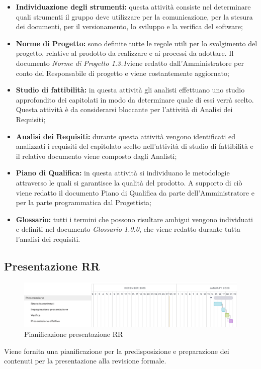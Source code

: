 \begin{itemize}
	\item \textbf{Individuazione degli strumenti:} questa attività consiste nel determinare quali strumenti il gruppo deve utilizzare per la comunicazione, per la stesura dei documenti, per il versionamento, lo sviluppo e la verifica del software;
	\item \textbf{Norme di Progetto:} sono definite tutte le regole utili per lo svolgimento del progetto, relative al prodotto da realizzare e ai processi da adottare. Il documento \textit{Norme di Progetto 1.3.1}\doc viene redatto dall'Amministratore per conto del Responsabile di progetto e viene costantemente aggiornato;
	\item \textbf{Studio di fattibilità:} in questa attività gli analisti effettuano uno studio approfondito dei capitolati in modo da determinare quale di essi verrà scelto. Questa attività è da considerarsi bloccante per l’attività di Analisi dei Requisiti;
	\item \textbf{Analisi dei Requisiti:} durante questa attività vengono identificati ed analizzati i requisiti del capitolato scelto nell'attività di studio di fattibilità e il relativo documento viene composto dagli Analisti;
	\item \textbf{Piano di Qualifica:} in questa attività si individuano le metodologie attraverso le quali si garantisce la qualità del prodotto. A supporto di ciò viene redatto il documento Piano di Qualifica da parte dell'Amministratore e per la parte programmatica dal Progettista;
	\item \textbf{Glossario:} tutti i termini che possono risultare ambigui vengono individuati e definiti nel documento \textit{Glossario 1.0.0}\docs, che viene redatto durante tutta l'analisi dei requisiti.
\end{itemize}
\newpage
\subsection{Presentazione RR}
\begin{figure}[h!]
	\includegraphics[width=\textwidth]{res/img/g2}
	\caption{Pianificazione presentazione RR}
\end{figure}
Viene fornita una pianificazione per la predisposizione e preparazione dei contenuti per la presentazione alla revisione formale.
\newpage
